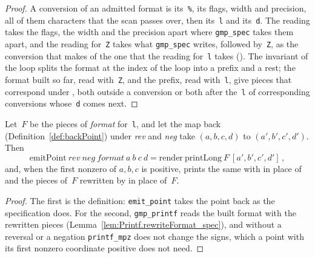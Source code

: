 \begin{proof}
  \leanok
  A conversion of an admitted format is its~\texttt{\%}, its flags, width and precision, all of them
  characters that the scan passes over, then its~\texttt{l} and its~\texttt{d}. The reading takes
  the flags, the width and the precision apart where \texttt{gmp\_spec} takes them apart, and the
  reading for~\texttt{Z} takes what \texttt{gmp\_spec} writes, followed by~\texttt{Z}, as the
  conversion that  makes of the one that the reading
  for~\texttt{l} takes (). The invariant of the loop
   splits the format at the index of the loop into a prefix
  and a rest; the format built so far, read with~\texttt{Z}, and the prefix, read with~\texttt{l},
  give pieces that correspond under , both outside a conversion
  or both after the~\texttt{l} of corresponding conversions whose~\texttt{d} comes next.
\end{proof}

\begin{lemma}\label{lem:Printf.emitPoint_eq_render}
  \leanok
  Let~$F$ be the pieces  of \textit{format} for~\texttt{l}, and
  let the map back (Definition~\ref{def:backPoint}) under \textit{rev} and \textit{neg} take $(a,
  b, c, d)$ to $(a', b', c', d')$. Then
  \[
    \mathrm{emitPoint}\ \mathit{rev}\ \mathit{neg}\ \mathit{format}\ a\ b\ c\ d
      = \mathrm{render}\ \mathrm{printLong}\ F\ [a', b', c', d']\,,
  \]
  and, when the first nonzero of $a, b, c$ is positive,  prints the
  same with  in place of  and the
  pieces of~$F$ rewritten by  in place of~$F$.
\end{lemma}

\begin{proof}
  \leanok
  The first is the definition: \texttt{emit\_point} takes the point back as the specification
  does. For the second, \texttt{gmp\_printf} reads the built format with the rewritten pieces
  (Lemma~\ref{lem:Printf.rewriteFormat_spec}), and without a reversal or a negation
  \texttt{printf\_mpz} does not change the signs, which a point with its first nonzero coordinate
  positive does not need.
\end{proof}

